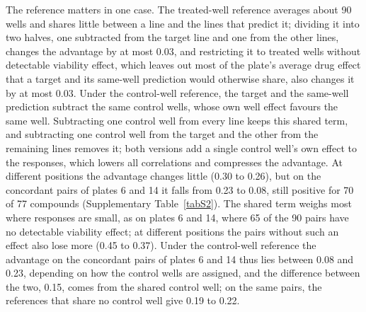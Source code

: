 \documentclass[pdflatex,sn-nature]{sn-jnl}
\begin{document}
The reference matters in one case. The treated-well reference averages about 90 wells and shares little between a line and the lines that predict it; dividing it into two halves, one subtracted from the target line and one from the other lines, changes the advantage by at most 0.03, and restricting it to treated wells without detectable viability effect, which leaves out most of the plate's average drug effect that a target and its same-well prediction would otherwise share, also changes it by at most 0.03. Under the control-well reference, the target and the same-well prediction subtract the same control wells, whose own well effect favours the same well. Subtracting one control well from every line keeps this shared term, and subtracting one control well from the target and the other from the remaining lines removes it; both versions add a single control well's own effect to the responses, which lowers all correlations and compresses the advantage. At different positions the advantage changes little (0.30 to 0.26), but on the concordant pairs of plates 6 and 14 it falls from 0.23 to 0.08, still positive for 70 of 77 compounds (Supplementary Table~\ref{tabS2}). The shared term weighs most where responses are small, as on plates 6 and 14, where 65 of the 90 pairs have no detectable viability effect; at different positions the pairs without such an effect also lose more (0.45 to 0.37). Under the control-well reference the advantage on the concordant pairs of plates 6 and 14 thus lies between 0.08 and 0.23, depending on how the control wells are assigned, and the difference between the two, 0.15, comes from the shared control well; on the same pairs, the references that share no control well give 0.19 to 0.22.
\end{document}
